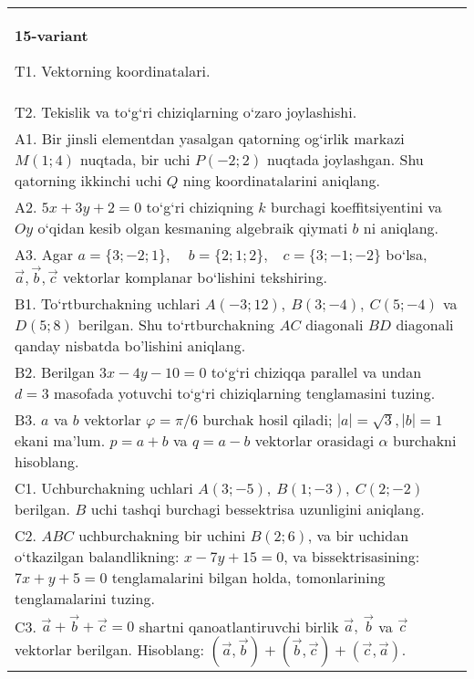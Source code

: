 \documentclass{article}
\begin{document}
\begin{tabular}{m{17cm}}
\textbf{15-variant}
\newline

T1. 
Vektorning koordinatalari.
 \\
T2. 
Tekislik va to‘g‘ri chiziqlarning o‘zaro joylashishi.
 \\
A1. 
Bir jinsli elementdan yasalgan qatorning og‘irlik markazi
$M (1;4) $ nuqtada, bir uchi $P (-2;2) $ nuqtada joylashgan. Shu
qatorning ikkinchi uchi $Q$ ning koordinatalarini aniqlang.
 \\
A2. 
$5x+3y+2=0$ to‘g‘ri chiziqning $k$ burchagi
koeffitsiyentini va $Oy$ o‘qidan kesib olgan kesmaning algebraik
qiymati $b$ ni aniqlang.
 \\
A3. 
Agar \(a = \{ 3; - 2;1\},\ \ \ \ \ b = \{ 2;1;2\},\ \ \ \ c = \{ 3; - 1; - 2\}\) bo‘lsa, $\overrightarrow{a}, \overrightarrow{b}, \overrightarrow{c}$ vektorlar komplanar bo‘lishini tekshiring.
 \\
B1. 
To‘rtburchakning uchlari
\(A (-3;12),\ B (3;-4),\ C (5;-4) \) va \(D (5;8) \) berilgan. Shu
to‘rtburchakning $AC$ diagonali $BD$ diagonali qanday
nisbatda bo'lishini aniqlang.
 \\
B2. 
Berilgan \(3x-4y-10=0\) to‘g‘ri chiziqqa parallel va undan
$d=3$ masofada yotuvchi to‘g‘ri chiziqlarning tenglamasini tuzing.
 \\
B3. 
$a$ va $b$ vektorlar $\varphi = \pi/6$ burchak hosil qiladi; $|a| = \sqrt{3},|b| = 1$ ekani ma’lum. $p = a + b$ va $q = a - b$ vektorlar orasidagi $\alpha$ burchakni hisoblang.
 \\
C1. 
Uchburchakning uchlari
\(A (3; - 5),\ B (1; - 3),\ C (2; - 2) \) berilgan. $B$ uchi tashqi
burchagi bessektrisa uzunligini aniqlang.
 \\
C2. 
$ABC$ uchburchakning bir uchini \(B (2;6) \), va
bir uchidan o‘tkazilgan balandlikning: \(x - 7y + 15 = 0\), va
bissektrisasining: \(7x + y + 5 = 0\) tenglamalarini bilgan holda,
tomonlarining tenglamalarini tuzing. \\
C3. \(\vec{a} + \vec{b} + \vec{c} = 0\) shartni qanoatlantiruvchi birlik \(\vec{a},\ \vec{b}\) va \(\vec{c}\) vektorlar berilgan. Hisoblang: \(\left(\vec{a},\vec{b} \right) + \left(\vec{b},\vec{c} \right) + \left(\vec{c},\vec{a} \right) \).
 \\

\end{tabular}
\vspace{1cm}
\end{document}
